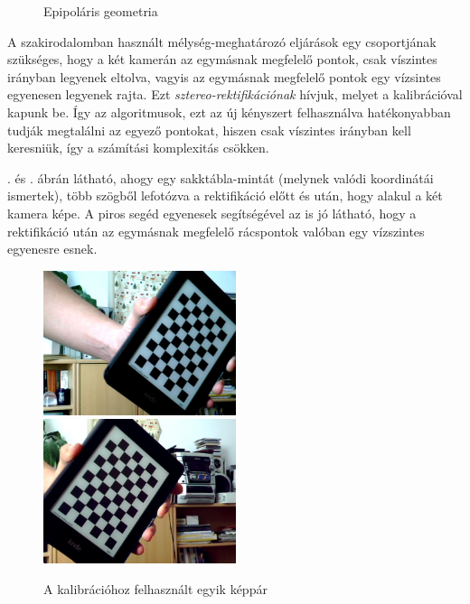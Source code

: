 \begin{figure}[tbh]
\caption{Epipoláris geometria \label{fig:epipolar}}
\end{figure}

A szakirodalomban használt mélység-meghatározó eljárások egy csoportjának \cite{SGBM, stereo-var} szükséges, hogy a két kamerán az egymásnak megfelelő pontok, csak víszintes irányban legyenek eltolva, vagyis az egymásnak megfelelő pontok egy vízsintes egyenesen legyenek rajta. Ezt \textit{sztereo-rektifikációnak} hívjuk, melyet a kalibrációval kapunk be. Így az algoritmusok, ezt az új kényszert felhasználva hatékonyabban tudják megtalálni az egyező pontokat, hiszen csak víszintes irányban kell keresniük, így a számítási komplexitás csökken.

. és . ábrán látható, ahogy egy sakktábla-mintát (melynek valódi koordinátái ismertek), több szögből lefotózva a rektifikáció előtt és után, hogy alakul a két kamera képe. A piros segéd egyenesek segítségével az is jó látható, hogy a rektifikáció után az egymásnak megfelelő rácspontok valóban egy vízszintes egyenesre esnek.

\begin{figure}[tbh]
  \centering
  \includegraphics[width=160pt]{figures/left07.jpg}\hspace{10pt}
  \includegraphics[width=160pt]{figures/right07.jpg}
  \caption{A kalibrációhoz felhasznált egyik képpár   \label{fig:stereo-calibration-before}}
\end{figure}

